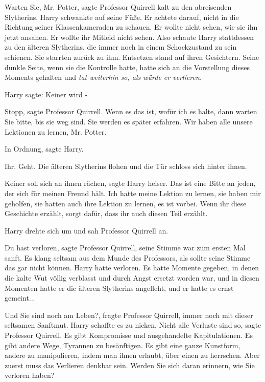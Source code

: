 \glqq{}Warten Sie, Mr. Potter\grqq{}, sagte Professor Quirrell kalt zu den
abreisenden Slytherins. Harry schwankte auf seine Füße. Er achtete darauf, nicht
in die Richtung seiner Klassenkameraden zu schauen. Er wollte nicht sehen, wie
sie ihn jetzt ansahen. Er wollte ihr Mitleid nicht sehen. Also schaute Harry
stattdessen zu den älteren Slytherins, die immer noch in einem Schockzustand zu
sein schienen. Sie starrten zurück zu ihm. Entsetzen stand auf ihren Gesichtern.
Seine dunkle Seite, wenn sie die Kontrolle hatte, hatte sich an die Vorstellung
dieses Moments gehalten und \emph{tat weiterhin so, als würde er verlieren.}

Harry sagte: \glqq{}Keiner wird -\grqq{}

\glqq{}Stopp\grqq{}, sagte Professor Quirrell. \glqq{}Wenn es das ist, wofür ich
es halte, dann warten Sie bitte, bis sie weg sind. Sie werden es später
erfahren. Wir haben alle unsere Lektionen zu lernen, Mr. Potter.\grqq{}

\glqq{}In Ordnung\grqq{}, sagte Harry.

\glqq{}Ihr. Geht.\grqq{} Die älteren Slytherins flohen und die Tür schloss sich
hinter ihnen.

\glqq{}Keiner soll sich an ihnen rächen\grqq{}, sagte Harry heiser. \glqq{}Das ist
eine Bitte an jeden, der sich für meinen Freund hält. Ich hatte meine Lektion zu
lernen, sie haben mir geholfen, sie hatten auch ihre Lektion zu lernen, es ist
vorbei. Wenn ihr diese Geschichte erzählt, sorgt dafür, dass ihr auch diesen
Teil erzählt.\grqq{}

Harry drehte sich um und sah Professor Quirrell an.

\glqq{}Du hast verloren\grqq{}, sagte Professor Quirrell, seine Stimme war zum
ersten Mal sanft. Es klang seltsam aus dem Munde des Professors, als sollte
seine Stimme das gar nicht können. Harry hatte verloren. Es hatte Momente
gegeben, in denen die kalte Wut völlig verblasst und durch Angst ersetzt worden
war, und in diesen Momenten hatte er die älteren Slytherins angefleht, und er
hatte es ernst gemeint...

\glqq{}Und Sie sind noch am Leben?\grqq{}, fragte Professor Quirrell, immer noch
mit dieser seltsamen Sanftmut. Harry schaffte es zu nicken. \glqq{}Nicht alle
Verluste sind so\grqq{}, sagte Professor Quirrell. \glqq{}Es gibt Kompromisse und
ausgehandelte Kapitulationen. Es gibt andere Wege, Tyrannen zu besänftigen. Es
gibt eine ganze Kunstform, andere zu manipulieren, indem man ihnen erlaubt, über
einen zu herrschen. Aber zuerst muss das Verlieren denkbar sein. Werden Sie sich
daran erinnern, wie Sie verloren haben?\grqq{}

